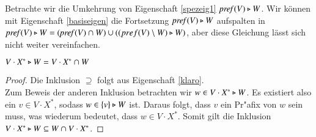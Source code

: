 Betrachte wir die Umkehrung von Eigenschaft \ref{spezeig1} $\mathit{pref{(}}V)\triangleright W$. Wir können mit Eigenschaft \ref{basiseigen} die Fortsetzung $\mathit{pref{(}}V)\triangleright W$ aufspalten in $\mathit{pref{(}}V)\triangleright W= (\mathit{pref{(}}V)\cap W) \cup ((pref(V)\setminus W)\triangleright W)$, aber diese Gleichung lässt sich nicht weiter vereinfachen.


\vspace{2ex}

\begin{eigen}
$V\cdot X^* \triangleright W = V\cdot X^* \cap W$
\end{eigen}
\begin{proof}
Die Inklusion $\supseteq$ folgt aus Eigenschaft \ref{klaro}.\\
Zum Beweis der anderen Inklusion betrachten wir $w\in V\cdot X^* \triangleright W$. Es existiert also ein $v\in V\cdot X^*$, sodass $w\in \{v\}\triangleright W$ ist. Daraus folgt, dass $v$ ein Pr"afix von $w$ sein muss, was wiederum bedeutet, dass $w\in V\cdot X^*$. Somit gilt die Inklusion $V\cdot X^* \triangleright W \subseteq W\cap V\cdot X^*$.
\end{proof}


